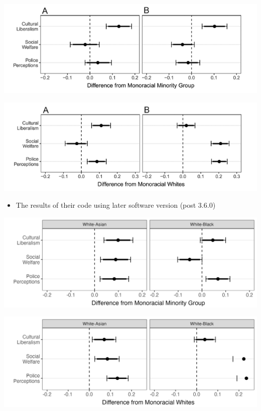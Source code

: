 \documentclass[
  letterpaper,
  DIV=11,
  numbers=noendperiod]{scrartcl}
\providecommand{\tightlist}{%
  \setlength{\itemsep}{0pt}\setlength{\parskip}{0pt}}\usepackage{longtable,booktabs,array}
\begin{document}
\includegraphics[width=1\textwidth,height=\textheight]{./figures/figure1_screenshot.png}

\includegraphics[width=1\textwidth,height=\textheight]{./figures/figure2_screenshot.png}

\begin{itemize}
\tightlist
\item
  The results of their code using later software version (post 3.6.0)
\end{itemize}

\includegraphics[width=1\textwidth,height=\textheight]{./figures/figure1_postchange.png}

\includegraphics[width=1\textwidth,height=\textheight]{./figures/figure2_postchange.png}
\end{document}
